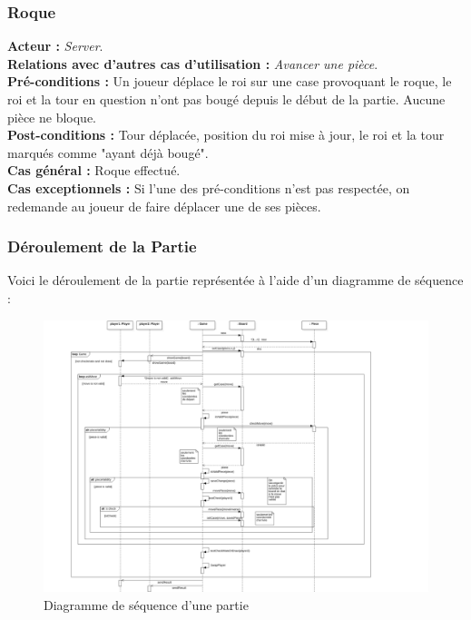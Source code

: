 \documentclass[10pt, a4paper]{article}
\begin{document}
\subsubsection{Roque}
\textbf{Acteur :} \textit{Server}. \\
\textbf{Relations avec d'autres cas d'utilisation :} {\itshape Avancer une pièce}. \\
\textbf{Pré-conditions :} Un joueur déplace le roi sur une case provoquant le roque, le roi et la tour en question n'ont pas bougé depuis le début de la partie. Aucune pièce ne bloque. \\
\textbf{Post-conditions :} Tour déplacée, position du roi mise à jour, le roi et la tour marqués comme "ayant déjà bougé". \\
\textbf{Cas général :} Roque effectué. \\
\textbf{Cas exceptionnels :} Si l'une des pré-conditions n'est pas respectée, on redemande au joueur de faire déplacer une de ses pièces. \\


\subsubsection{Déroulement de la Partie}
Voici le déroulement de la partie représentée à l'aide d'un diagramme de séquence : \\

\begin{figure}[H]
\centering
\includegraphics[scale=0.8]{SequenceDiagramClassicChessTurn.png}
\caption{Diagramme de séquence d'une partie}
\label{SD_classicgame}
\end{figure}
\clearpage
\end{document}
